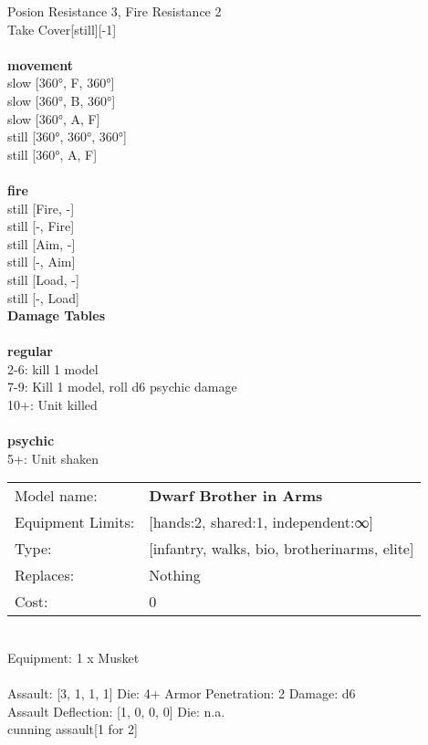 \noindent Posion Resistance 3, Fire Resistance 2\\ 
Take Cover[still][-1]\\ 


\ \\ {\bf movement } \\
slow [360°, F, 360°] \\
slow [360°, B, 360°] \\
slow [360°, A, F] \\
still [360°, 360°, 360°] \\
still [360°, A, F] \\
\ \\ {\bf fire } \\
still [Fire, -] \\
still [-, Fire] \\
still [Aim, -] \\
still [-, Aim] \\
still [Load, -] \\
still [-, Load] \\


{\bf Damage Tables} \\
\ \\ {\bf regular } \\
2-6: kill 1 model \\
7-9: Kill 1 model, roll d6 psychic damage \\
10+: Unit killed \\
\ \\ {\bf psychic } \\
5+: Unit shaken \\


\noindent
\begin{tabular}{ll}
Model name: &{\bf Dwarf Brother in Arms } \\
Equipment Limits: &[hands:2, shared:1, independent:∞] \\
Type: &[infantry, walks, bio, brotherinarms, elite] \\
Replaces: &Nothing \\
Cost: & 0\\
\end{tabular}
\ \\
Equipment: 1 x Musket \\
\ \\
Assault: [3, 1, 1, 1] Die: 4+ Armor Penetration: 2 Damage: d6 \\
Assault Deflection: [1, 0, 0, 0] Die: n.a.\\
\indent cunning assault[1 for 2]\\ 
 
